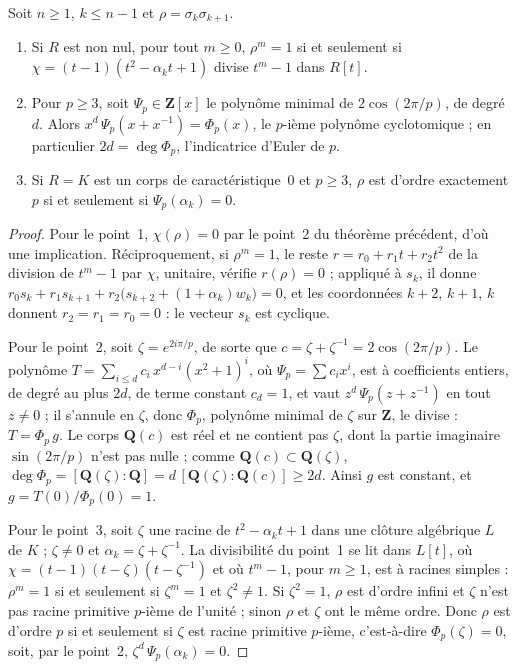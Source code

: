 \begin{encadre}
\begin{theoreme}
Soit $n \geq 1$, $k \leq n - 1$ et $\rho = \sigma_k\sigma_{k+1}$.
\begin{enumerate}
\item Si $R$ est non nul, pour tout $m \geq 0$, $\rho^m = 1$ si et seulement si $\chi = (t - 1)(t^2 - \alpha_k t + 1)$ divise $t^m - 1$ dans $R[t]$.
\item Pour $p \geq 3$, soit $\Psi_p \in \mathbf Z[x]$ le polynôme minimal de $2\cos(2\pi/p)$, de degré $d$. Alors $x^d\,\Psi_p(x + x^{-1}) = \Phi_p(x)$, le $p$-ième polynôme cyclotomique ; en particulier $2d = \deg \Phi_p$, l'indicatrice d'Euler de $p$.
\item Si $R = K$ est un corps de caractéristique~$0$ et $p \geq 3$, $\rho$ est d'ordre exactement $p$ si et seulement si $\Psi_p(\alpha_k) = 0$.
\end{enumerate}
\end{theoreme}
\end{encadre}

\begin{proof}
Pour le point~1, $\chi(\rho) = 0$ par le point~2 du théorème précédent, d'où une implication. Réciproquement, si $\rho^m = 1$, le reste $r = r_0 + r_1 t + r_2 t^2$ de la division de $t^m - 1$ par $\chi$, unitaire, vérifie $r(\rho) = 0$ ; appliqué à $s_k$, il donne $r_0 s_k + r_1 s_{k+1} + r_2\bigl(s_{k+2} + (1 + \alpha_k) w_k\bigr) = 0$, et les coordonnées $k + 2$, $k + 1$, $k$ donnent $r_2 = r_1 = r_0 = 0$ : le vecteur $s_k$ est cyclique.

Pour le point~2, soit $\zeta = e^{2i\pi/p}$, de sorte que $c = \zeta + \zeta^{-1} = 2\cos(2\pi/p)$. Le polynôme $T = \sum_{i \leq d} c_i\, x^{d-i}(x^2 + 1)^i$, où $\Psi_p = \sum c_i x^i$, est à coefficients entiers, de degré au plus $2d$, de terme constant $c_d = 1$, et vaut $z^d\,\Psi_p(z + z^{-1})$ en tout $z \neq 0$ ; il s'annule en $\zeta$, donc $\Phi_p$, polynôme minimal de $\zeta$ sur $\mathbf Z$, le divise : $T = \Phi_p\, g$. Le corps $\mathbf Q(c)$ est réel et ne contient pas $\zeta$, dont la partie imaginaire $\sin(2\pi/p)$ n'est pas nulle ; comme $\mathbf Q(c) \subset \mathbf Q(\zeta)$, $\deg \Phi_p = [\mathbf Q(\zeta) : \mathbf Q] = d\,[\mathbf Q(\zeta) : \mathbf Q(c)] \geq 2d$. Ainsi $g$ est constant, et $g = T(0)/\Phi_p(0) = 1$.

Pour le point~3, soit $\zeta$ une racine de $t^2 - \alpha_k t + 1$ dans une clôture algébrique $L$ de $K$ ; $\zeta \neq 0$ et $\alpha_k = \zeta + \zeta^{-1}$. La divisibilité du point~1 se lit dans $L[t]$, où $\chi = (t - 1)(t - \zeta)(t - \zeta^{-1})$ et où $t^m - 1$, pour $m \geq 1$, est à racines simples : $\rho^m = 1$ si et seulement si $\zeta^m = 1$ et $\zeta^2 \neq 1$. Si $\zeta^2 = 1$, $\rho$ est d'ordre infini et $\zeta$ n'est pas racine primitive $p$-ième de l'unité ; sinon $\rho$ et $\zeta$ ont le même ordre. Donc $\rho$ est d'ordre $p$ si et seulement si $\zeta$ est racine primitive $p$-ième, c'est-à-dire $\Phi_p(\zeta) = 0$, soit, par le point~2, $\zeta^d\,\Psi_p(\alpha_k) = 0$.
\end{proof}

